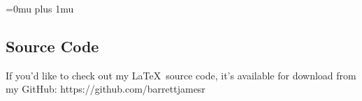 \documentclass[pdftex]{article}
\begin{document}
\newpage

\Urlmuskip=0mu plus 1mu\relax

\nocite{*}


\begin{appendices}
\section{Source Code} \label{App:AppendixA}
If you'd like to check out my \LaTeX\ source code, it's available for download from my GitHub: https://github.com/barrettjamesr
\end{appendices}
\end{document}
